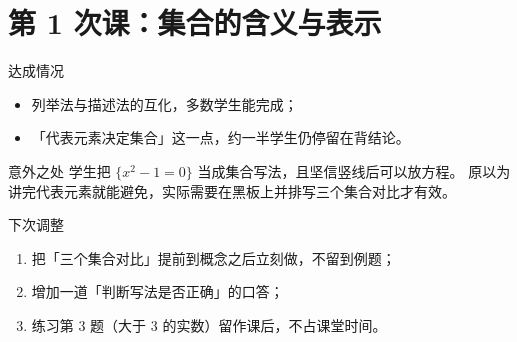 \section{第 1 次课：集合的含义与表示}

\begin{teachreflect}{达成情况}
\begin{itemize}
  \item 列举法与描述法的互化，多数学生能完成；
  \item 「代表元素决定集合」这一点，约一半学生仍停留在背结论。
\end{itemize}
\end{teachreflect}

\begin{teachreflect}{意外之处}
学生把 $\{x^2-1=0\}$ 当成集合写法，且坚信竖线后可以放方程。
原以为讲完代表元素就能避免，实际需要在黑板上并排写三个集合对比才有效。
\end{teachreflect}

\begin{teachreflect}{下次调整}
\begin{enumerate}
  \item 把「三个集合对比」提前到概念之后立刻做，不留到例题；
  \item 增加一道「判断写法是否正确」的口答；
  \item 练习第 3 题（大于 3 的实数）留作课后，不占课堂时间。
\end{enumerate}
\end{teachreflect}
